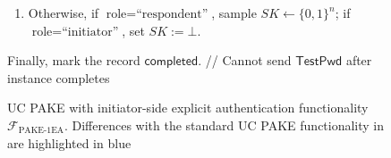 \documentclass{article}
\theoremstyle{plain}
\theoremstyle{definition}
\theoremstyle{remark}
\newcommand{\func}{\mathcal{F}}
\newcommand{\Fpake}{\func_\mathrm{PAKE\text{-}1EA}}
\newcommand{\TestPwd}{\mathsf{TestPwd}}
\newcommand{\completed}{\mathsf{completed}}
\begin{document}
\begin{figure}[H]
\begin{framed}
\begin{small}
\begin{itemize}
\begin{enumerate}
              \item Otherwise, {\color{blue}if $\text{role} = \text{``respondent''}$}, sample $SK \gets \{0,1\}^n$; {\color{blue}if $\text{role} = \text{``initiator''}$, set $SK := \bot$}.
            \end{enumerate}
            Finally, mark the record $\completed$. \quad \textcolor[gray]{0.5}{// Cannot send $\TestPwd$ after instance completes}
    \end{itemize}
\end{small}
\end{framed}
\caption{UC PAKE with initiator-side explicit authentication functionality $\Fpake$. Differences with the standard UC PAKE functionality in \cite{EC:CHKLM05} are highlighted in {\color{blue}blue}}
\label{fig:pake-func}
\end{figure}
\end{document}
